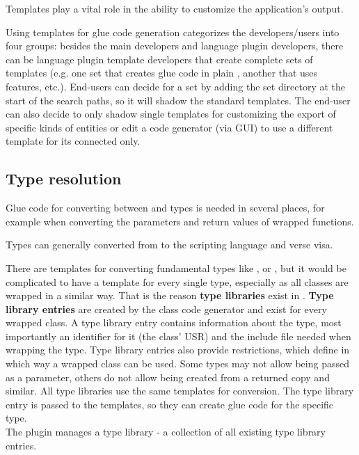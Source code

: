 Templates play a vital role in the ability to customize the application's output.

Using templates for glue code generation categorizes the developers/users into four groups: besides the  main developers and language plugin developers, there can be language plugin template developers that create complete sets of templates (e.g. one set that creates glue code in plain , another that uses  features, etc.).  End-users can decide for a set by adding the set directory at the start of the search paths, so it will shadow the standard templates. The end-user can also decide to only shadow single templates for customizing the export of specific kinds of entities or edit a code generator (via GUI) to use a different template for its connected  only.

\subsection{Type resolution}

Glue code for converting between  and  types is needed in several places, for example when converting the parameters and return values of wrapped functions.

Types can generally converted from  to the scripting language and verse visa.

There are templates for converting fundamental types like ,  or , but it would be complicated to have a template for every single type, especially as all classes are wrapped in a similar way. That is the reason \textbf{type libraries} exist in . \textbf{Type library entries} are created by the class code generator and exist for every wrapped class. A type library entry contains information about the type, most importantly an identifier for it (the class' USR) and the include file needed when wrapping the type. Type library entries also provide restrictions, which define in which way a wrapped class can be used. Some types may not allow being passed as a parameter, others do not allow being created from a returned copy and similar. All type libraries use the same templates for conversion. The type library entry is passed to the templates, so they can create glue code for the specific type.\\
The plugin manages a type library -  a collection of all existing type library entries.

